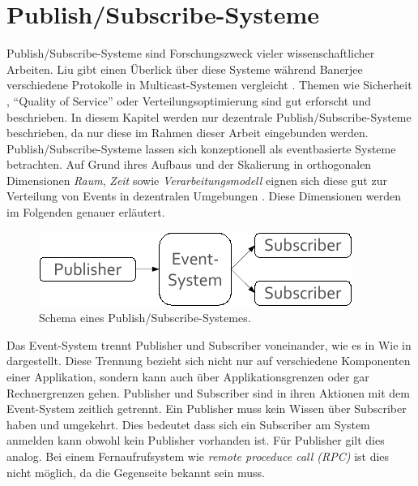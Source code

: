 \section{Publish/Subscribe-Systeme}
\label{chap:grundlagen:pubsub}
Publish/Subscribe-Systeme sind Forschungszweck vieler wissenschaftlicher Arbeiten. Liu gibt einen Überlick über diese Systeme \cite{Liu2003Survey} während Banerjee verschiedene Protokolle in Multicast-Systemen vergleicht \cite{Banerjee2001Comparative}. Themen wie Sicherheit \cite{FiegeSecurity}, ``Quality of Service'' \cite{BeFiMu2006PubSubQoS} oder Verteilungsoptimierung \cite{Muhl2002LargeScale, Castro2002Scribe} sind gut erforscht und beschrieben. In diesem Kapitel werden nur dezentrale Publish/Subscribe-Systeme beschrieben, da nur diese im Rahmen dieser Arbeit eingebunden werden. Publish/Subscribe-Systeme lassen sich konzeptionell als eventbasierte Systeme betrachten. Auf Grund ihres Aufbaus und der Skalierung  in orthogonalen Dimensionen \emph{Raum}, \emph{Zeit} sowie \emph{Verarbeitungsmodell} eignen sich diese gut zur Verteilung von Events in dezentralen Umgebungen \cite{PatrickTh2003Many}. Diese Dimensionen werden im Folgenden genauer erläutert.

\begin{figure}[htbp]
\centering
\includegraphics{grafics/pubsub_black_box.pdf}
\caption{Schema eines Publish/Subscribe-Systemes.}
\label{fig:pubsub_black_box}
\end{figure}


Das Event-System trennt Publisher und Subscriber voneinander, wie es in Wie in  dargestellt. Diese Trennung bezieht sich nicht nur auf verschiedene Komponenten einer Applikation, sondern kann auch über Applikationsgrenzen oder gar Rechnergrenzen gehen. Publisher und Subscriber sind in ihren Aktionen mit dem Event-System zeitlich getrennt. Ein Publisher muss kein Wissen über Subscriber haben und umgekehrt. Dies bedeutet dass sich ein Subscriber am System anmelden kann obwohl kein Publisher vorhanden ist. Für Publisher gilt dies analog. Bei einem Fernaufrufsystem wie \emph{remote proceduce call (RPC)} \cite{Birrell1984Implementing} ist dies nicht möglich, da die Gegenseite bekannt sein muss.

